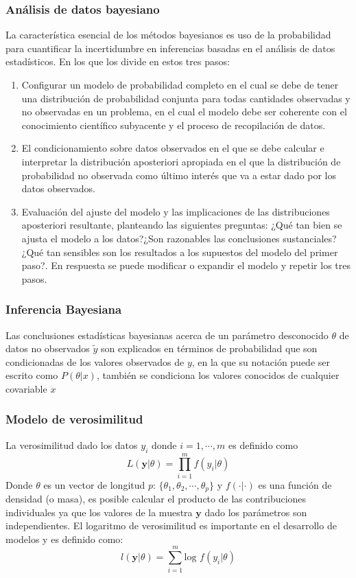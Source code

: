 \subsubsection{Análisis de datos bayesiano}
La característica esencial de los métodos bayesianos es uso de la probabilidad para cuantificar la incertidumbre en inferencias basadas en el análisis de datos estadísticos. En los que \cite{gelman1995bayesian} los divide en estos tres pasos:
\begin{enumerate}
    \item Configurar un modelo de probabilidad completo en el cual se debe de tener una distribución de probabilidad conjunta para todas cantidades observadas y no observadas en un problema, en el cual el modelo debe ser coherente con el conocimiento científico subyacente y el proceso de recopilación de datos.
    \item El condicionamiento sobre datos observados en el que se debe calcular e interpretar la distribución aposteriori apropiada en el que la distribución de probabilidad no observada como último interés que va a estar dado por los datos observados.
    \item Evaluación del ajuste del modelo y las implicaciones de las distribuciones aposteriori resultante, planteando las siguientes preguntas: ¿Qué tan bien se ajusta el modelo a los datos?¿Son razonables las conclusiones sustanciales?¿Qué tan sensibles son los resultados a los supuestos del modelo del primer paso?. En respuesta se puede modificar o expandir el modelo y repetir los tres pasos.
\end{enumerate}

\subsubsection{Inferencia Bayesiana}
Las conclusiones estadísticas bayesianas acerca de un parámetro desconocido $\theta$ de datos no observados $\tilde{y}$ son explicados en términos de probabilidad que son condicionadas de los valores observados de $y$, en la que su notación puede ser escrito como $P(\theta | x)$, también se condiciona los valores conocidos de cualquier covariable $x$ \cite{gelman1995bayesian}

\subsubsection{Modelo de verosimilitud}\citep{lawson2018bayesian}
La verosimilitud dado los datos $y_i$ donde $i = 1, \cdots, m$ es definido como
$$
L(\mathbf{y}|\theta) = \prod\limits_{i = 1}^{m}f({y}_{i}|\theta)
$$
Donde $\theta$ es un vector de longitud $p$: $\{ {\theta}_{1}, {\theta}_{2}, \cdots , {\theta}_{p} \}$ y $f(\cdot | \cdot)$ es una función de densidad (o masa), es posible calcular el producto de las contribuciones individuales ya que los valores de la muestra $\mathbf{y}$ dado los parámetros son independientes. El logaritmo de verosimilitud es importante en el desarrollo de modelos y es definido como:
$$
l(\mathbf{y}| \theta) = \sum\limits_{i = 1}^{m}\text{log }f({y}_{i}| \theta)
$$

